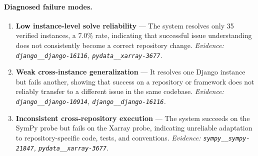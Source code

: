 \paragraph{Diagnosed failure modes.}\begin{enumerate}\itemsep1pt
\item \textbf{Low instance-level solve reliability} --- The system resolves only 35 verified instances, a 7.0\% rate, indicating that successful issue understanding does not consistently become a correct repository change. \emph{Evidence: \texttt{django\_\_django-16116}, \texttt{pydata\_\_xarray-3677}.}
\item \textbf{Weak cross-instance generalization} --- It resolves one Django instance but fails another, showing that success on a repository or framework does not reliably transfer to a different issue in the same codebase. \emph{Evidence: \texttt{django\_\_django-10914}, \texttt{django\_\_django-16116}.}
\item \textbf{Inconsistent cross-repository execution} --- The system succeeds on the SymPy probe but fails on the Xarray probe, indicating unreliable adaptation to repository-specific code, tests, and conventions. \emph{Evidence: \texttt{sympy\_\_sympy-21847}, \texttt{pydata\_\_xarray-3677}.}
\end{enumerate}
